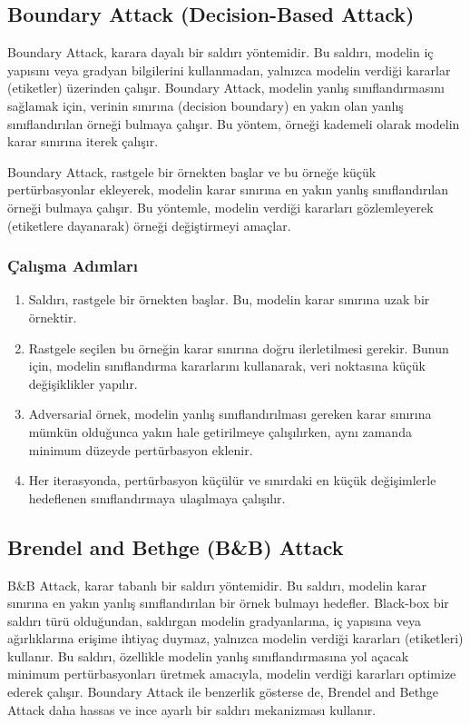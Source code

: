 \newpage

\subsection{Boundary Attack (Decision-Based Attack)}

Boundary Attack, karara dayalı bir saldırı yöntemidir. Bu saldırı, modelin iç yapısını veya gradyan bilgilerini kullanmadan, yalnızca modelin verdiği kararlar (etiketler) üzerinden çalışır. Boundary Attack, modelin yanlış sınıflandırmasını sağlamak için, verinin sınırına (decision boundary) en yakın olan yanlış sınıflandırılan örneği bulmaya çalışır. Bu yöntem, örneği kademeli olarak modelin karar sınırına iterek çalışır.

Boundary Attack, rastgele bir örnekten başlar ve bu örneğe küçük pertürbasyonlar ekleyerek, modelin karar sınırına en yakın yanlış sınıflandırılan örneği bulmaya çalışır. Bu yöntemle, modelin verdiği kararları gözlemleyerek (etiketlere dayanarak) örneği değiştirmeyi amaçlar.

\subsubsection{Çalışma Adımları}

\begin{enumerate}
    \item Saldırı, rastgele bir örnekten başlar. Bu, modelin karar sınırına uzak bir örnektir.
    \item Rastgele seçilen bu örneğin karar sınırına doğru ilerletilmesi gerekir. Bunun için, modelin sınıflandırma kararlarını kullanarak, veri noktasına küçük değişiklikler yapılır.
    \item Adversarial örnek, modelin yanlış sınıflandırılması gereken karar sınırına mümkün olduğunca yakın hale getirilmeye çalışılırken, aynı zamanda minimum düzeyde pertürbasyon eklenir.
    \item Her iterasyonda, pertürbasyon küçülür ve sınırdaki en küçük değişimlerle hedeflenen sınıflandırmaya ulaşılmaya çalışılır.
\end{enumerate}

\newpage

\subsection{Brendel and Bethge (B\&B) Attack}

B\&B Attack, karar tabanlı bir saldırı yöntemidir. Bu saldırı, modelin karar sınırına en yakın yanlış sınıflandırılan bir örnek bulmayı hedefler. Black-box bir saldırı türü olduğundan, saldırgan modelin gradyanlarına, iç yapısına veya ağırlıklarına erişime ihtiyaç duymaz, yalnızca modelin verdiği kararları (etiketleri) kullanır. Bu saldırı, özellikle modelin yanlış sınıflandırmasına yol açacak minimum pertürbasyonları üretmek amacıyla, modelin verdiği kararları optimize ederek çalışır. Boundary Attack ile benzerlik gösterse de, Brendel and Bethge Attack daha hassas ve ince ayarlı bir saldırı mekanizması kullanır.

